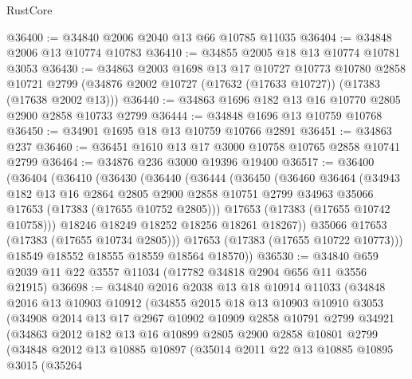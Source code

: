 \begin{lexlean}{RustCore}
\begin{coremodule}
@36400 := @34840 @2006 @2040 @13 @66 @10785 @11035
@36404 := @34848 @2006 @13 @10774 @10783
@36410 := @34855 @2005 @18 @13 @10774 @10781 @3053
@36430 := @34863
    @2003
    @1698
    @13
    @17
    @10727
    @10773
    @10780
    @2858
    @10721
    @2799
    (@34876 @2002 @10727 (@17632 (@17633 @10727)) (@17383 (@17638 @2002 @13)))
@36440 := @34863 @1696 @182 @13 @16 @10770 @2805 @2900 @2858 @10733 @2799
@36444 := @34848 @1696 @13 @10759 @10768
@36450 := @34901 @1695 @18 @13 @10759 @10766 @2891
@36451 := @34863 @237
@36460 := @36451 @1610 @13 @17 @3000 @10758 @10765 @2858 @10741 @2799
@36464 := @34876 @236 @3000 @19396 @19400
@36517 := @36400
    (@36404
      (@36410
        (@36430
          (@36440
            (@36444
              (@36450
                (@36460
                  @36464
                  (@34943
                    @182
                    @13
                    @16
                    @2864
                    @2805
                    @2900
                    @2858
                    @10751
                    @2799
                    @34963
                    @35066
                    @17653
                    (@17383 (@17655 @10752 @2805)))
                  @17653
                  (@17383 (@17655 @10742 @10758)))
                @18246
                @18249
                @18252
                @18256
                @18261
                @18267))
            @35066
            @17653
            (@17383 (@17655 @10734 @2805)))
          @17653
          (@17383 (@17655 @10722 @10773)))
        @18549
        @18552
        @18555
        @18559
        @18564
        @18570))
@36530 := @34840 @659 @2039 @11 @22 @3557 @11034 (@17782 @34818 @2904 @656 @11 @3556 @21915)
@36698 := @34840
    @2016
    @2038
    @13
    @18
    @10914
    @11033
    (@34848
      @2016
      @13
      @10903
      @10912
      (@34855
        @2015
        @18
        @13
        @10903
        @10910
        @3053
        (@34908
          @2014
          @13
          @17
          @2967
          @10902
          @10909
          @2858
          @10791
          @2799
          @34921
          (@34863
            @2012
            @182
            @13
            @16
            @10899
            @2805
            @2900
            @2858
            @10801
            @2799
            (@34848
              @2012
              @13
              @10885
              @10897
              (@35014
                @2011
                @22
                @13
                @10885
                @10895
                @3015
                (@35264

\end{coremodule}
\end{lexlean}
